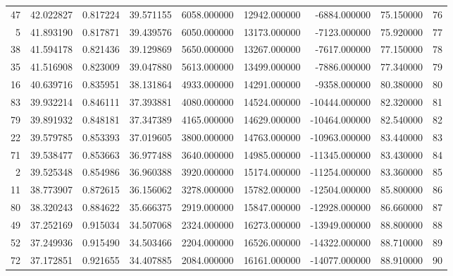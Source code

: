 \begin{tabular}{rrrrrrrrr}
47 & 42.022827 & 0.817224 & 39.571155 & 6058.000000 & 12942.000000 & -6884.000000 & 75.150000 & 76 \\
5 & 41.893190 & 0.817871 & 39.439576 & 6050.000000 & 13173.000000 & -7123.000000 & 75.920000 & 77 \\
38 & 41.594178 & 0.821436 & 39.129869 & 5650.000000 & 13267.000000 & -7617.000000 & 77.150000 & 78 \\
35 & 41.516908 & 0.823009 & 39.047880 & 5613.000000 & 13499.000000 & -7886.000000 & 77.340000 & 79 \\
16 & 40.639716 & 0.835951 & 38.131864 & 4933.000000 & 14291.000000 & -9358.000000 & 80.380000 & 80 \\
83 & 39.932214 & 0.846111 & 37.393881 & 4080.000000 & 14524.000000 & -10444.000000 & 82.320000 & 81 \\
79 & 39.891932 & 0.848181 & 37.347389 & 4165.000000 & 14629.000000 & -10464.000000 & 82.540000 & 82 \\
22 & 39.579785 & 0.853393 & 37.019605 & 3800.000000 & 14763.000000 & -10963.000000 & 83.440000 & 83 \\
71 & 39.538477 & 0.853663 & 36.977488 & 3640.000000 & 14985.000000 & -11345.000000 & 83.430000 & 84 \\
2 & 39.525348 & 0.854986 & 36.960388 & 3920.000000 & 15174.000000 & -11254.000000 & 83.360000 & 85 \\
11 & 38.773907 & 0.872615 & 36.156062 & 3278.000000 & 15782.000000 & -12504.000000 & 85.800000 & 86 \\
80 & 38.320243 & 0.884622 & 35.666375 & 2919.000000 & 15847.000000 & -12928.000000 & 86.660000 & 87 \\
49 & 37.252169 & 0.915034 & 34.507068 & 2324.000000 & 16273.000000 & -13949.000000 & 88.800000 & 88 \\
52 & 37.249936 & 0.915490 & 34.503466 & 2204.000000 & 16526.000000 & -14322.000000 & 88.710000 & 89 \\
72 & 37.172851 & 0.921655 & 34.407885 & 2084.000000 & 16161.000000 & -14077.000000 & 88.910000 & 90 \\
\bottomrule
\end{tabular}
